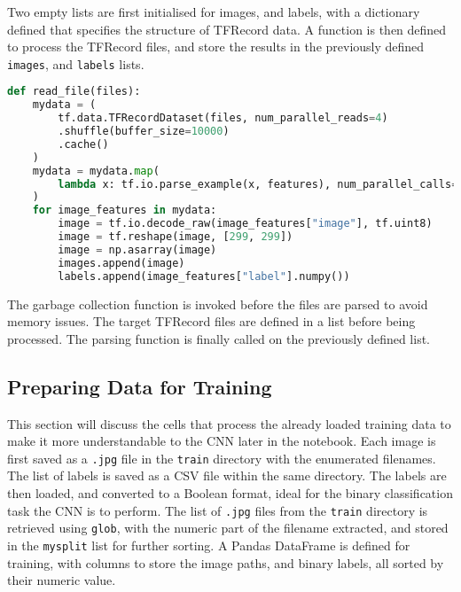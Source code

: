 \documentclass[../main]{subfiles}
\begin{document}
Two empty lists are first initialised for images, and labels, with a dictionary
defined that specifies the structure of TFRecord data. A function is then
defined to process the TFRecord files, and store the results in the
previously defined \texttt{images}, and \texttt{labels} lists. 

\begin{lstlisting}[language=Python, caption={Data ingestion from TFRecord files.}]
def read_file(files):
    mydata = (
        tf.data.TFRecordDataset(files, num_parallel_reads=4)
        .shuffle(buffer_size=10000)
        .cache()
    )
    mydata = mydata.map(
        lambda x: tf.io.parse_example(x, features), num_parallel_calls=4
    )
    for image_features in mydata:
        image = tf.io.decode_raw(image_features["image"], tf.uint8)
        image = tf.reshape(image, [299, 299])
        image = np.asarray(image)
        images.append(image)
        labels.append(image_features["label"].numpy())
\end{lstlisting}

The garbage collection function is invoked before the files are parsed to
avoid memory issues. The target TFRecord files are defined in a list before being processed. The parsing function is finally called on the previously
defined list.

\subsection{Preparing Data for Training}
This section will discuss the cells that process the already loaded training
data to make it more understandable to the CNN later in the notebook. Each
image is first saved as a \texttt{.jpg} file in the \texttt{train} directory
with the enumerated filenames. The list of labels is saved as a CSV file within the
same directory. The labels are then loaded, and converted to a Boolean format,
ideal for the binary classification task the CNN is to perform. The list of
\texttt{.jpg} files from the \texttt{train} directory is retrieved using
\texttt{glob}, with the numeric part of the filename extracted, and stored in
the \texttt{mysplit} list for further sorting. A Pandas DataFrame is defined
for training, with columns to store the image paths, and binary labels, all
sorted by their numeric value.
\end{document}
